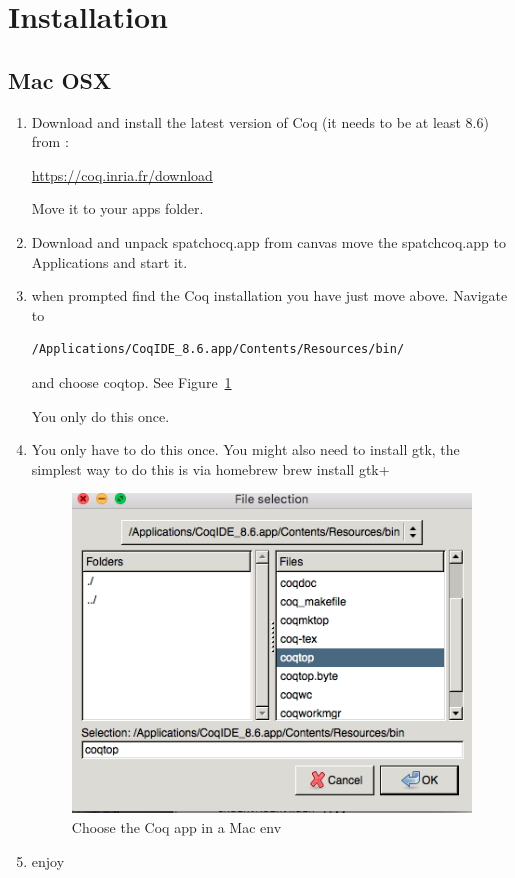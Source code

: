 

\section{ Installation}

\subsection{Mac OSX}
\begin{enumerate}
\item Download and install  the latest version of Coq (it needs to be at least 8.6) from :

\href{https://coq.inria.fr/download}{https://coq.inria.fr/download}

Move it to your apps folder.


\item  Download and unpack spatchocq.app from canvas
move the spatchcoq.app to Applications and start it. 

\item when prompted find the Coq installation you have just move above. Navigate to 
\begin{verbatim}
/Applications/CoqIDE_8.6.app/Contents/Resources/bin/
\end{verbatim}
and choose coqtop. See Figure~\ref{fig:macos}

You only do this once.
\item  You only have to do this once. You might also need to install gtk, the simplest way to do this is  via homebrew
{\center brew install gtk+}
\begin{figure}\label{fig:macos}
\center
\includegraphics[scale=0.5]{Installation/macos.png}
\caption{Choose the Coq app in a Mac env}\label{fig:macos}
\end{figure}
\item enjoy

\end{enumerate}


